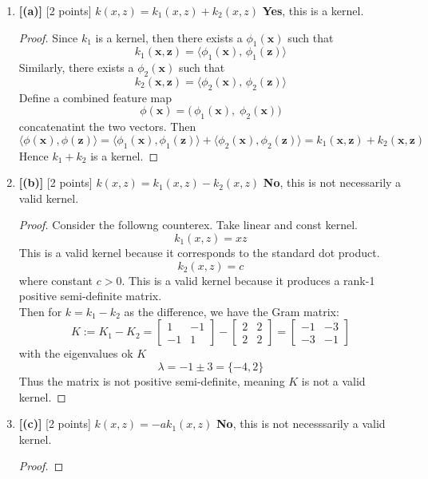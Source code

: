 \documentclass[lang=cn,11pt]{elegantbook}
\begin{document}
\begin{enumerate}
    \item \textbf{[(a)]} [2 points] $k(x, z) = k_1(x, z) + k_2(x, z)$
\textbf{Yes}, this is a kernel.
\begin{proof}
Since \(k_1\) is a kernel, then there exists a \(\phi_1(\mathbf{x})\) such that \[
  k_1(\mathbf{x}, \mathbf{z}) = \langle \phi_1(\mathbf{x}), \,\phi_1(\mathbf{z}) \rangle
\]
Similarly, there exists a \(\phi_2(\mathbf{x})\) such that \[
  k_2(\mathbf{x}, \mathbf{z}) = \langle \phi_2(\mathbf{x}), \,\phi_2(\mathbf{z}) \rangle
\]
Define a combined feature map
\[
  \phi(\mathbf{x}) =\bigl(\,\phi_1(\mathbf{x}),\;\phi_2(\mathbf{x})\bigr)
\]
concatenatint the two vectors. Then \[
  \langle \phi(\mathbf{x}), \phi(\mathbf{z}) \rangle  =\langle \phi_1(\mathbf{x}), \phi_1(\mathbf{z})\rangle  +  \langle \phi_2(\mathbf{x}), \phi_2(\mathbf{z})\rangle 
= k_1(\mathbf{x}, \mathbf{z}) + k_2(\mathbf{x}, \mathbf{z})
\]
Hence \(k_1 + k_2\) is a kernel.
\end{proof}
    \item \textbf{[(b)]} [2 points] $k(x, z) = k_1(x, z) - k_2(x, z)$
\textbf{No}, this is not necessarily a valid kernel.
\begin{proof}
Consider the followng counterex.
Take linear and const kernel. \[
   k_1(x, z) = x z
   \]
This is a valid kernel because it corresponds to the standard dot product. \[
   k_2(x, z) = c
   \]
where constant \( c > 0 \). This is a valid kernel because it produces a rank-1 positive semi-definite matrix. \\
Then for $k = k_1 - k_2$ as the difference, we have the Gram matrix:  \[
  K :=  K_1 - K_2=   \begin{bmatrix}
  1 & -1 \\
  -1 & 1
  \end{bmatrix}  -  \begin{bmatrix}
  2 & 2 \\
  2 & 2
  \end{bmatrix}   =
  \begin{bmatrix}
  -1 & -3 \\
  -3 & -1
  \end{bmatrix}  \]
with the eigenvalues ok $K$\[
\lambda = -1 \pm 3 = \{-4, 2\}
\]
Thus the matrix is not positive semi-definite, meaning \( K \) is not a valid kernel.
\end{proof}
    \item \textbf{[(c)]} [2 points] $k(x, z) = -a k_1(x, z)$
\textbf{No}, this is not necesssarily a valid kernel.
\begin{proof}

\end{proof}
\end{enumerate}
\end{document}
